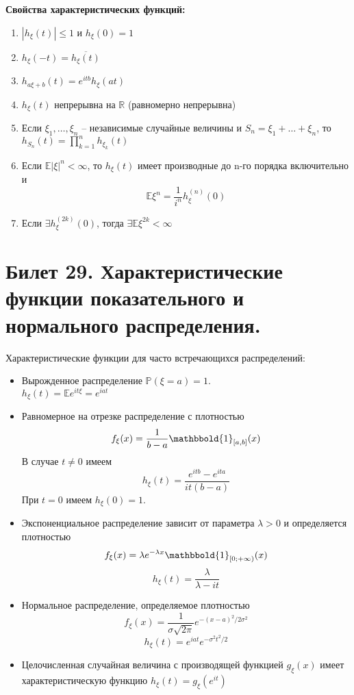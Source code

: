 	\textbf{Свойства характеристических функций:}
	\begin{enumerate}
		\item $|h_\xi(t)|\leqslant1$ и $h_\xi(0) = 1$
		\item $h_\xi(-t) = \overline{h_\xi(t)}$
		\item $h_{a\xi+b}(t) = e^{itb}h_\xi(at)$
		\item $h_{\xi}(t)$ непрерывна на $\mathbb{R}$ (равномерно непрерывна)
		\item Если $\xi_1, \dots, \xi_n$ -- независимые случайные величины и $S_n = \xi_1+\dots+\xi_n$, то $h_{S_n}(t) = \prod\limits_{k=1}^nh_{\xi_k}(t)$
		\item Если $\mathbb{E}|\xi|^n < \infty$, то $h_\xi(t)$ имеет производные до n-го порядка включительно и
		\[\mathbb{E}\xi^n = \frac{1}{i^n}h_\xi^{(n)}(0) \]
		\item Если $\exists h_{\xi}^{(2k)}(0)$, тогда $\exists \mathbb{E}\xi^{2k} < \infty$
	\end{enumerate}
	
	\section{Билет 29. Характеристические функции показательного и нормального распределения.}
	
	\vspace{5mm}
	
	Характеристические функции для часто встречающихся распределений:
	
	\begin{itemize}
		\item Вырожденное распределение $\mathbb{P}(\xi = a) = 1$. \\$h_\xi(t) = \mathbb{E}e^{it\xi} = e^{iat}$
		\item Равномерное на отрезке распределение с плотностью
		\[
		f_\xi(x) = \frac{1}{b-a}\mathbbold{1}_{[a,b]}(x)
		\]
		В случае $t \neq 0$ имеем
		\[
		h_\xi(t) = \frac{e^{itb} - e^{ita}}{it(b-a)}
		\]
		При $t = 0$ имеем $h_\xi(0) = 1$.
		\item Экспоненциальное распределение зависит от параметра $\lambda > 0$ и определяется плотностью
		\[
		f_\xi(x) = \lambda e^{-\lambda x}\mathbbold{1}_{[0;+\infty)}(x)
		\]
		\[
		h_\xi(t) = \frac{\lambda}{\lambda - it}
		\]
		\item Нормальное распределение, определяемое плотностью
		\[
		f_\xi(x) = \frac{1}{\sigma\sqrt{2\pi}}e^{-(x-a)^2/2\sigma^2}
		\]
		\[
		h_\xi(t) = e^{iat}e^{-\sigma^2t^2/2}
		\]
		\item Целочисленная случайная величина с производящей функцией $g_\xi(x)$ имеет характеристическую функцию $h_\xi(t) = g_\xi(e^{it})$
	\end{itemize}
	
